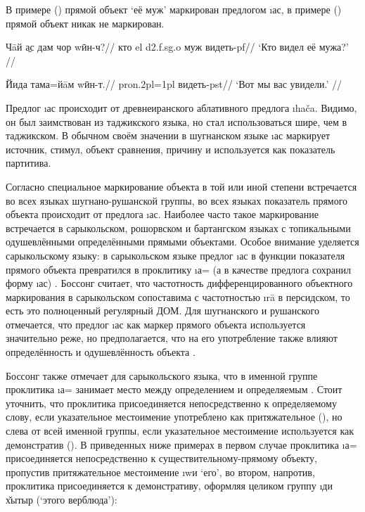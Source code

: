 В примере () прямой объект ‘её муж’ маркирован предлогом \i{ас}, в примере () прямой объект никак не маркирован.

\begingl
\gla Чāй \b{ас} дам чор wӣн-ч?//
\glc кто {\sc el} {\sc d2.f.sg.o} муж видеть-{\sc pf}//
\glft ‘Кто видел её мужа?’ //
\endgl \xe

\begingl
\gla Йида тама=йāм wӣн-т.//
 {\sc pron.2pl=1pl} видеть-{\sc pst}//
\glft ‘Вот мы вас увидели.’ //
\endgl \xe

Предлог \i{ас} происходит от древнеиранского аблативного предлога \*\i{hača}. Видимо, он был заимствован из таджикского языка, но стал использоваться шире, чем в таджикском. В обычном своём значении в шугнанском языке \i{ас} маркирует источник, стимул, объект сравнения, причину и используется как показатель партитива.

Согласно \parencites[101]{bossong1985}[163–167]{payne1980} специальное маркирование объекта в той или иной степени встречается во всех языках шугнано-рушанской группы, во всех языках показатель прямого объекта происходит от предлога \i{ас}. Наиболее часто такое маркирование встречается в сарыкольском, рошорвском и бартангском языках с топикальными одушевлёнными определёнными прямыми объектами. Особое внимание уделяется сарыкольскому языку: в сарыкольском языке предлог \i{ас} в функции показателя прямого объекта превратился в проклитику \i{а}= (а в качестве предлога сохранил форму \i{ас}) \parencite[101]{bossong1985}. Боссонг считает, что частотность дифференцированного объектного маркирования в сарыкольском сопоставима с частотностью \i{rā} в персидском, то есть это полноценный регулярный ДОМ. Для шугнанского и рушанского отмечается, что предлог \i{ас} как маркер прямого объекта используется значительно реже, но предполагается, что на его употребление также влияют определённость и одушевлённость объекта \parencite[101]{bossong1985}.

Боссонг также отмечает для сарыкольского языка, что в именной группе проклитика \i{а}= занимает место между определением и определяемым \parencite[101]{bossong1985}. Стоит уточнить, что проклитика присоединяется непосредственно к определяемому слову, если указательное местоимение употреблено как притяжательное (), но слева от всей именной группы, если указательное местоимение используется как демонстратив (). В приведенных ниже примерах в первом случае проклитика \i{а}= присоединяется непосредственно к существительному-прямому объекту, пропустив притяжательное местоимение \i{wи} ‘его’, во втором, напротив, проклитика присоединяется к демонстративу, оформляя целиком группу \i{ди х̌ытыр} (‘этого верблюда’):

